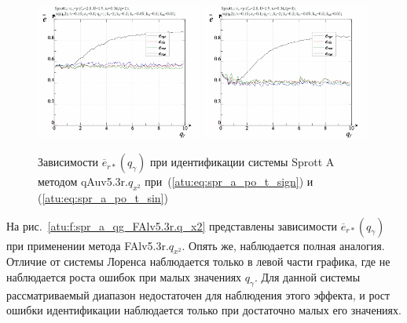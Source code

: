 \begin{figure}[h!]
  \centerline{
    \includegraphics[width=0.49\textwidth]{p/cha/spr_a/qAuv5.3r/sprott_a_qAuv5_3r_qx2-p_qgamma_e_sign.png}
    \hfill
    \includegraphics[width=0.49\textwidth]{p/cha/spr_a/qAuv5.3r/sprott_a_qAuv5_3r_qx2-p_qgamma_e_sin.png}
  }
  \caption{Зависимости $\overline{e}_{r*}(q_\gamma)$ при идентификации системы Sprott A методом qAuv5.3r.$q_{x^2}$
   при~(\ref{atu:eq:spr_a_po_t_sign}) и (\ref{atu:eq:spr_a_po_t_sin})}
  \label{atu:f:spr_a_qg_qAuv5.3r.q_x2}
\end{figure}

На рис.~\ref{atu:f:spr_a_qg_FAlv5.3r.q_x2} представлены зависимости
$\overline{e}_{r*}(q_\gamma)$ при применении метода FAlv5.3r.$q_{x^2}$.
Опять же, наблюдается полная аналогия. Отличие от системы Лоренса наблюдается только
в левой части графика, где не наблюдается роста ошибок при
малых значениях $q_\gamma$. Для данной системы
рассматриваемый диапазон недостаточен для наблюдения этого эффекта,
и рост ошибки идентификации наблюдается только при достаточно малых его значениях.

